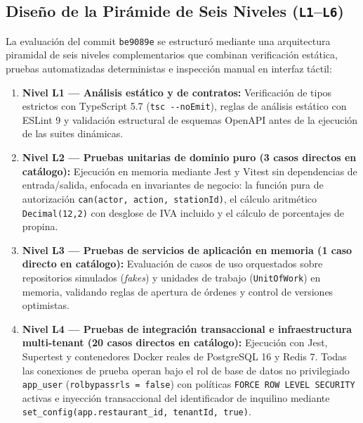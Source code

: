 \documentclass[stu,12pt,a4paper]{apa7}
\providecommand{\tightlist}{\setlength{\itemsep}{0pt}\setlength{\parskip}{0pt}}
\begin{document}
\subsection{\texorpdfstring{Diseño de la Pirámide de Seis Niveles (\texttt{L1}--\texttt{L6})}{Diseño de la Pirámide de Seis Niveles (--)}}\label{diseuxf1o-de-la-piruxe1mide-de-seis-niveles-l1l6}

La evaluación del commit \texttt{be9089e} se estructuró mediante una arquitectura piramidal de seis niveles complementarios que combinan verificación estática, pruebas automatizadas deterministas e inspección manual en interfaz táctil:

\begin{enumerate}
\def\labelenumi{\arabic{enumi}.}
\tightlist
\item
  \textbf{Nivel L1 --- Análisis estático y de contratos:} Verificación de tipos estrictos con TypeScript 5.7 (\texttt{tsc -{}\allowbreak{}-{}\allowbreak{}noEmit}), reglas de análisis estático con ESLint 9 y validación estructural de esquemas OpenAPI antes de la ejecución de las suites dinámicas.
\item
  \textbf{Nivel L2 --- Pruebas unitarias de dominio puro (3 casos directos en catálogo):} Ejecución en memoria mediante Jest y Vitest sin dependencias de entrada/salida, enfocada en invariantes de negocio: la función pura de autorización \texttt{can(\allowbreak{}actor,\allowbreak{} action,\allowbreak{} stationId)\allowbreak{}}, el cálculo aritmético \texttt{Decimal(\allowbreak{}12,\allowbreak{}2)\allowbreak{}} con desglose de IVA incluido y el cálculo de porcentajes de propina.
\item
  \textbf{Nivel L3 --- Pruebas de servicios de aplicación en memoria (1 caso directo en catálogo):} Evaluación de casos de uso orquestados sobre repositorios simulados (\emph{fakes}) y unidades de trabajo (\texttt{UnitOfWork}) en memoria, validando reglas de apertura de órdenes y control de versiones optimistas.
\item
  \textbf{Nivel L4 --- Pruebas de integración transaccional e infraestructura multi-tenant (20 casos directos en catálogo):} Ejecución con Jest, Supertest y contenedores Docker reales de PostgreSQL 16 y Redis 7. Todas las conexiones de prueba operan bajo el rol de base de datos no privilegiado \texttt{app\_\allowbreak{}user} (\texttt{rolbypassrls =\allowbreak{} false}) con políticas \texttt{FORCE ROW LEVEL SE\allowbreak{}CURITY} activas e inyección transaccional del identificador de inquilino mediante \texttt{set\_\allowbreak{}config(\allowbreak{}\textquotesingle{}app.\allowbreak{}restaurant\_\allowbreak{}id\textquotesingle{},\allowbreak{} tenantId,\allowbreak{} true)\allowbreak{}}.

\end{enumerate}
\end{document}
